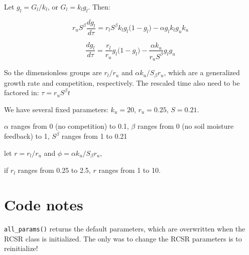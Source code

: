 \documentclass{article}
\newcommand{\code}[1]{\texttt{#1}}
\begin{document}
Let  $g_l = G_l/k_l$, or   $G_l =   k_l g_l$.  Then:

\begin{equation*}
r_u   S^\beta \frac{d g_l}{d \tau } = r_l S^\beta k_l g_l \big(1-g_l \big) - \alpha g_l k_l g_u k_u
\end{equation*}

\begin{equation*}
 \frac{d g_l}{d \tau } =\frac{ r_l}{r_u }  g_l \big(1-g_l \big) - \frac{\alpha k_u}{r_u  S^\beta}  g_l g_u
\end{equation*}

So the dimensionless groups are $r_l/r_u$ and $\alpha k_u / S_\beta r_u$, which are a generalized growth rate and competition, respectively.  The rescaled time also need to be factored in:  $\tau = r_u S^\beta t$


We have several fixed parameters:  $k_u = 20$, $r_u = 0.25$, $S=0.21$.

$\alpha$ ranges from 0 (no competition) to 0.1,
$\beta$ ranges from 0 (no soil moisture feedback) to 1, $S^\beta$ ranges from 1  to 0.21

let  $r = r_l/r_u$ and $\phi =  \alpha k_u / S_\beta r_u$,

if $r_l$ ranges from 0.25 to 2.5,  $r$ ranges from 1 to 10.


\section{Code notes}

\code{all\_params()} returns the default parameters, which are overwritten when the RCSR class is initialized. 
The only was to change the RCSR parameters is to reinitialize!  
\end{document}
